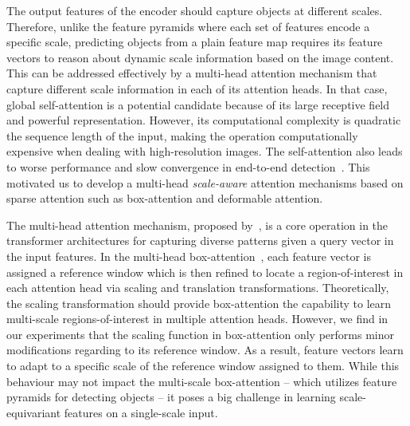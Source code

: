  The output features of the encoder should capture objects at different scales. Therefore, unlike the feature pyramids where each set of features encode a specific scale, predicting objects from a plain feature map requires its feature vectors to reason about dynamic scale information based on the image content. This can be addressed effectively by a multi-head attention mechanism that capture different scale information in each of its attention heads. 
In that case, global self-attention is a potential candidate because of its large receptive field and powerful representation. However, its computational complexity is quadratic \wrt the sequence length of the input, making the operation computationally expensive when dealing with high-resolution images. The self-attention also leads to worse performance and slow convergence in end-to-end detection~\cite{zhu2021deformable}. This motivated us to develop a multi-head \emph{scale-aware} attention mechanisms based on sparse attention such as box-attention and deformable attention.

The multi-head attention mechanism, proposed by~\cite{vaswani2017transformer}, is a core operation in the transformer architectures for capturing diverse patterns given a query vector in the input features. In the multi-head box-attention~\cite{nguyen2022boxer}, each feature vector is assigned a reference window which is then refined to locate a region-of-interest in each attention head via scaling and translation transformations. Theoretically, the scaling transformation should provide box-attention the capability to learn multi-scale regions-of-interest in multiple attention heads. However, we find in our experiments that the scaling function in box-attention only performs minor modifications regarding to its reference window. As a result, feature vectors learn to adapt to a specific scale of the reference window assigned to them. While this behaviour may not impact the multi-scale box-attention -- which utilizes feature pyramids for detecting objects -- it poses a big challenge in learning scale-equivariant features on a single-scale input.

